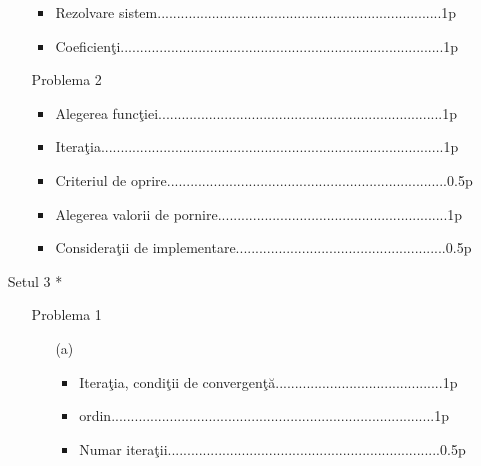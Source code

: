 \documentclass{article}%
\begin{document}
\begin{enumerate}
\begin{enumerate}
\begin{itemize}
\item Rezolvare sistem.........................................................................1p

\item Coeficien\c{t}i...................................................................................1p
\end{itemize}

\item[Problema 2] 

\begin{itemize}
\item Alegerea func\c{t}iei.........................................................................1p

\item Itera\c{t}ia........................................................................................1p

\item Criteriul de oprire........................................................................0.5p

\item Alegerea valorii de pornire...........................................................1p

\item Considera\c{t}ii de implementare......................................................0.5p
\end{itemize}
\end{enumerate}

\item[Setul 3] *

\begin{enumerate}
\item[Problema 1] 

\begin{enumerate}
\item[(a)] 

\begin{itemize}
\item Itera\c{t}ia, condi\c{t}ii de convergen\c{t}\u{a}...........................................1p

\item ordin...................................................................................1p

\item Numar itera\c{t}ii......................................................................0.5p
\end{itemize}


\end{enumerate}
\end{enumerate}
\end{enumerate}
\end{document}

